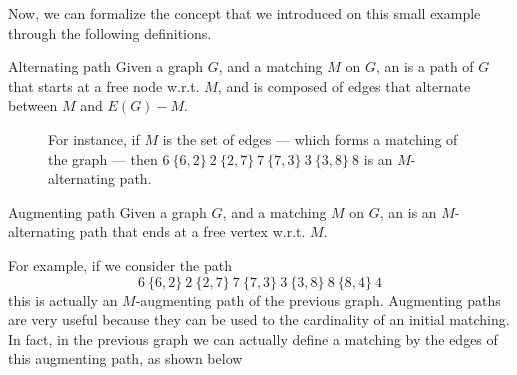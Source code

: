 \documentclass[a4paper, 12pt]{report}
\begin{document}
    Now, we can formalize the concept that we introduced on this small example through the following definitions.

    \begin{frameddefn}{Alternating path}
        Given a graph $G$, and a matching $M$ on $G$, an  is a path of $G$ that starts at a free node w.r.t. $M$, and is composed of edges that alternate between $M$ and $E(G) - M$.
    \end{frameddefn}

        \begin{figure}[H]
        \centering
        \caption{For instance, if $M$ is the set of  edges --- which forms a matching of the graph --- then $6 \ \{6, 2\} \ 2 \ \{2, 7\} \ 7 \ \{7, 3\} \ 3 \ \{3, 8\} \ 8$ is an $M$-alternating path.}
    \end{figure}

    \begin{frameddefn}{Augmenting path}
        Given a graph $G$, and a matching $M$ on $G$, an  is an $M$-alternating path that ends at a free vertex w.r.t. $M$.
    \end{frameddefn}

    For example, if we consider the path $$6 \ \{6, 2\} \ 2 \ \{2, 7\} \ 7 \ \{7, 3\} \ 3 \ \{3, 8\} \ 8 \ \{8, 4 \} \ 4$$ this is actually an $M$-augmenting path of the previous graph. Augmenting paths are very useful because they can be used to  the cardinality of an initial matching. In fact, in the previous graph we can actually define a  matching by  the edges of this augmenting path, as shown below
\end{document}
